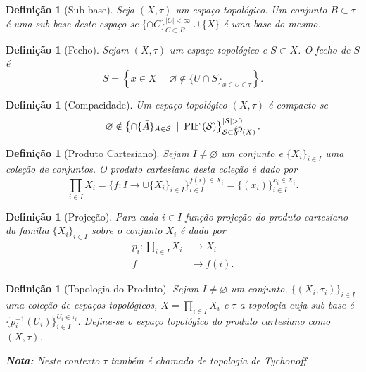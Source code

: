 \documentclass{article}
\newtheorem{definition}[theorem]{Definição}
\newcommand{\function}[3]{#1:#2\rightarrow#3}
\newcommand{\powerset}{\raisebox{.15\baselineskip}{\Large\ensuremath{\wp}}}
\newcommand{\suchthat}{\enspace|\enspace}
\newcommand{\fip}[1]{\text{PIF\,}(#1)}
\begin{document}
\begin{definition}[Sub-base]
  Seja \((X,\tau)\) um espaço topológico. Um conjunto \(B\subset\tau\)
  é uma sub-base deste espaço se \(\{\cap C\}_{C\subset B}^{|C| <
    \infty}\cup \{X\}\) é uma base do mesmo.
\end{definition}

\begin{definition}[Fecho]
  Sejam \((X,\tau)\) um espaço topológico e \(S \subset X\). O fecho
  de \(S\) é \[\bar{S}=\left\{x \in X \suchthat \varnothing \notin \{U
    \cap S\}_{x\in U\in\tau}\right\}.\]
\end{definition}

\begin{definition}[Compacidade]
  Um espaço topológico \((X,\tau)\) é compacto se
  \[\varnothing \notin \left\{\cap \{\bar{A}\}_{A\in \mathcal{S}} \suchthat
    \fip{\mathcal{S}} \right\}_{\mathcal{S} \subset \powerset(X)}^{|\mathcal{S}|
    > 0}.\]
\end{definition}

\begin{definition}[Produto Cartesiano]
  Sejam \(I\neq\varnothing\) um conjunto e \(\{X_i\}_{i\in I}\) uma
  coleção de conjuntos.  O produto cartesiano desta coleção é dado por
  \[\prod_{i\in I}X_i = \{\function{f}{I}{\cup \{X_i\}_{i \in I}}\}_{i \in I}^{f(i) \in X_i} = \{(x_i)\}_{i \in I}^{x_i \in
    X_i}.\]
\end{definition}

\begin{definition}[Projeção]
  Para cada \(i \in I\) função projeção do produto cartesiano da
  família \(\{X_i\}_{i \in I}\) sobre o conjunto \(X_i\) é dada por
  \begin{align*}
    \function{p_i}{\prod_{i \in I}X_i&}{X_i} \\
    f & \rightarrow f(i).
  \end{align*}
\end{definition}

\begin{definition}[Topologia do Produto]
  Sejam \(I\neq\varnothing\) um conjunto, \(\{(X_i,\tau_i)\}_{i \in
    I}\) uma coleção de espaços topológicos, \(X=\prod_{i\in I}X_i\) e
  \(\tau\) a topologia cuja sub-base é \(\{p_i^{-1}(U_i)\}_{i \in
    I}^{U_i \in \tau_i}\).  Define-se o espaço topológico do produto
  cartesiano como \((X,\tau)\).

  \vspace{0.5em}\noindent\textbf{Nota:} Neste contexto \(\tau\) também
  é chamado de topologia de Tychonoff.
\end{definition}
\end{document}

